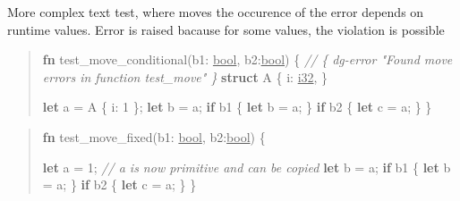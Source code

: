 \documentclass[
  11pt,
  twoside,symmetric]{report}
\newenvironment{Shaded}{}{}
\newcommand{\CommentTok}[1]{\textit{#1}}
\newcommand{\ControlFlowTok}[1]{\textbf{#1}}
\newcommand{\DataTypeTok}[1]{\underline{#1}}
\newcommand{\DecValTok}[1]{#1}
\newcommand{\KeywordTok}[1]{\textbf{#1}}
\newcommand{\NormalTok}[1]{#1}
\newcommand{\OperatorTok}[1]{#1}
\begin{document}
More complex text test, where moves the occurence of the error depends
on runtime values. Error is raised bacause for some values, the
violation is possible

\begin{quote}
\begin{Shaded}
\begin{Highlighting}[]
\KeywordTok{fn}\NormalTok{ test\_move\_conditional(b1}\OperatorTok{:} \DataTypeTok{bool}\OperatorTok{,}\NormalTok{ b2}\OperatorTok{:}\DataTypeTok{bool}\NormalTok{) }\OperatorTok{\{}
     \CommentTok{// \{ dg{-}error "Found move errors in function test\_move" \}}
    \KeywordTok{struct}\NormalTok{ A }\OperatorTok{\{}
\NormalTok{        i}\OperatorTok{:} \DataTypeTok{i32}\OperatorTok{,}
    \OperatorTok{\}}

    \KeywordTok{let}\NormalTok{ a }\OperatorTok{=}\NormalTok{ A }\OperatorTok{\{}\NormalTok{ i}\OperatorTok{:} \DecValTok{1} \OperatorTok{\};}
    \KeywordTok{let}\NormalTok{ b }\OperatorTok{=}\NormalTok{ a}\OperatorTok{;}
    \ControlFlowTok{if}\NormalTok{ b1 }\OperatorTok{\{}
        \KeywordTok{let}\NormalTok{ b }\OperatorTok{=}\NormalTok{ a}\OperatorTok{;}
    \OperatorTok{\}}
    \ControlFlowTok{if}\NormalTok{ b2 }\OperatorTok{\{}
        \KeywordTok{let}\NormalTok{ c }\OperatorTok{=}\NormalTok{ a}\OperatorTok{;}
    \OperatorTok{\}}
\OperatorTok{\}}
\end{Highlighting}
\end{Shaded}
\end{quote}

\begin{quote}
\begin{Shaded}
\begin{Highlighting}[]
\KeywordTok{fn}\NormalTok{ test\_move\_fixed(b1}\OperatorTok{:} \DataTypeTok{bool}\OperatorTok{,}\NormalTok{ b2}\OperatorTok{:}\DataTypeTok{bool}\NormalTok{) }\OperatorTok{\{}

    \KeywordTok{let}\NormalTok{ a }\OperatorTok{=} \DecValTok{1}\OperatorTok{;} \CommentTok{// a is now primitive and can be copied}
    \KeywordTok{let}\NormalTok{ b }\OperatorTok{=}\NormalTok{ a}\OperatorTok{;}
    \ControlFlowTok{if}\NormalTok{ b1 }\OperatorTok{\{}
        \KeywordTok{let}\NormalTok{ b }\OperatorTok{=}\NormalTok{ a}\OperatorTok{;}
    \OperatorTok{\}}
    \ControlFlowTok{if}\NormalTok{ b2 }\OperatorTok{\{}
        \KeywordTok{let}\NormalTok{ c }\OperatorTok{=}\NormalTok{ a}\OperatorTok{;}
    \OperatorTok{\}}
\OperatorTok{\}}
\end{Highlighting}
\end{Shaded}
\end{quote}
\end{document}
